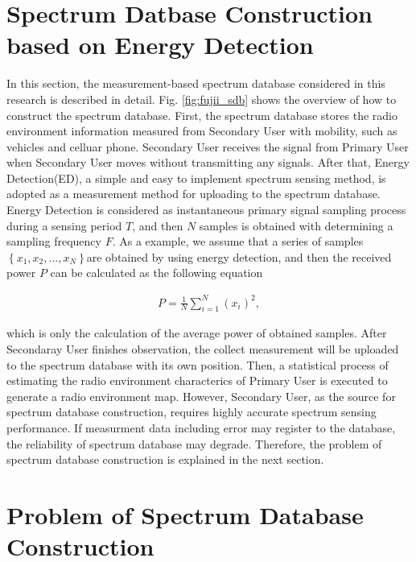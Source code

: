 \section{Spectrum Datbase Construction based on Energy Detection}
In this section, the measurement-based spectrum database considered in this research is described in detail. Fig. \ref{fig:fujii_sdb} shows the overview of how to construct the spectrum database. First, the spectrum database stores the radio environment information measured from Secondary User with mobility, such as vehicles and celluar phone. Secondary User receives the signal from Primary User when Secondary User moves without transmitting any signals. After that, Energy Detection(ED)\cite{ref:ED}, a simple and easy to implement spectrum sensing method, is adopted as a measurement method for uploading to the spectrum database. Energy Detection is considered as instantaneous primary signal sampling process during a sensing period $T$, and then $N$ samples is obtained with determining a sampling frequency $F$. As a example, we assume that a series of samples $\left\{x_1,x_2,...,x_N\right\}$are obtained by using energy detection, and then the received power $P$ can be calculated as the following equation

\begin{eqnarray}
P=\frac{1}{N}\sum_{i=1}^{N}(x_i)^2,
\end{eqnarray}

which is only the calculation of the average power of obtained samples.
After Secondaray User finishes observation, the collect measurement will be uploaded to the spectrum database with its own position. Then, a statistical process of estimating the radio environment characterics of Primary User is executed to generate a radio environment map. However, Secondary User, as the source for spectrum database construction, requires highly accurate spectrum sensing performance. If measurment data including error may register to the database, the reliability of spectrum database may degrade. Therefore, the problem of spectrum database construction is explained in the next section.
\section{Problem of Spectrum Database Construction }


